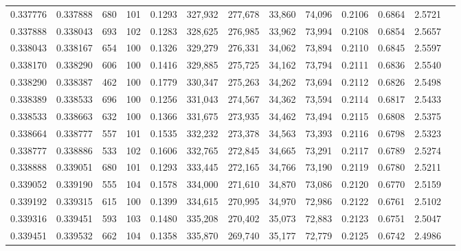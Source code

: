 \begin{tabular}{rrrrrrrrrrrrr}
0.337776 & 0.337888 &   680 & 101 &                                     0.1293 & 327,932 & 277,678 &  33,860 &  74,096 & 0.2106 & 0.6864 & 2.5721 \\
0.337888 & 0.338043 &   693 & 102 &                                     0.1283 & 328,625 & 276,985 &  33,962 &  73,994 & 0.2108 & 0.6854 & 2.5657 \\
0.338043 & 0.338167 &   654 & 100 &                                     0.1326 & 329,279 & 276,331 &  34,062 &  73,894 & 0.2110 & 0.6845 & 2.5597 \\
0.338170 & 0.338290 &   606 & 100 &                                     0.1416 & 329,885 & 275,725 &  34,162 &  73,794 & 0.2111 & 0.6836 & 2.5540 \\
0.338290 & 0.338387 &   462 & 100 &                                     0.1779 & 330,347 & 275,263 &  34,262 &  73,694 & 0.2112 & 0.6826 & 2.5498 \\
0.338389 & 0.338533 &   696 & 100 &                                     0.1256 & 331,043 & 274,567 &  34,362 &  73,594 & 0.2114 & 0.6817 & 2.5433 \\
0.338533 & 0.338663 &   632 & 100 &                                     0.1366 & 331,675 & 273,935 &  34,462 &  73,494 & 0.2115 & 0.6808 & 2.5375 \\
0.338664 & 0.338777 &   557 & 101 &                                     0.1535 & 332,232 & 273,378 &  34,563 &  73,393 & 0.2116 & 0.6798 & 2.5323 \\
0.338777 & 0.338886 &   533 & 102 &                                     0.1606 & 332,765 & 272,845 &  34,665 &  73,291 & 0.2117 & 0.6789 & 2.5274 \\
0.338888 & 0.339051 &   680 & 101 &                                     0.1293 & 333,445 & 272,165 &  34,766 &  73,190 & 0.2119 & 0.6780 & 2.5211 \\
0.339052 & 0.339190 &   555 & 104 &                                     0.1578 & 334,000 & 271,610 &  34,870 &  73,086 & 0.2120 & 0.6770 & 2.5159 \\
0.339192 & 0.339315 &   615 & 100 &                                     0.1399 & 334,615 & 270,995 &  34,970 &  72,986 & 0.2122 & 0.6761 & 2.5102 \\
0.339316 & 0.339451 &   593 & 103 &                                     0.1480 & 335,208 & 270,402 &  35,073 &  72,883 & 0.2123 & 0.6751 & 2.5047 \\
0.339451 & 0.339532 &   662 & 104 &                                     0.1358 & 335,870 & 269,740 &  35,177 &  72,779 & 0.2125 & 0.6742 & 2.4986 \\

\end{tabular}
